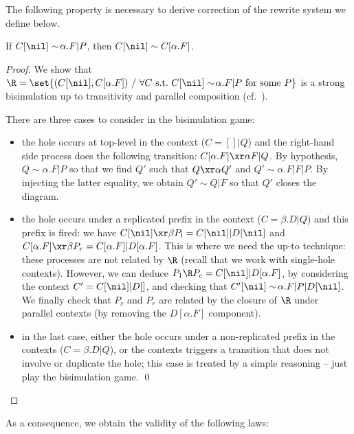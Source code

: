 \documentclass{llncs}
\begin{document}
The following property is necessary to derive correction of the
rewrite system we define below.
\begin{prop}\label{prop:simplelaw}
  If $C[\nil]\sim\!\alpha.F|P$, then $C[\nil]\sim C[\alpha.F]$.
\end{prop}
\begin{proof}
  We show that $\R = \set{(C[\nil], C[\alpha.F])~/~\forall C\text{
      s.t.\ } C[\nil]\sim\!\alpha.F|P\textrm{ for some }P}$ is a
  strong bisimulation up to transitivity and parallel composition
  (cf.~\cite{SW01,phd:pous}).

  There are three cases to consider in the bisimulation game:
  \begin{itemize}
  \item the hole occurs at top-level in the context ($C=[]|Q$) and the
    right-hand side process does the following transition:
    $C[\alpha.F]\xr\alpha F|Q$. By hypothesis, $Q\sim\!\alpha.F|P$ so
    that we find $Q'$ such that $Q\xr\alpha Q'$ and $Q'\sim
    \!\alpha.F|F|P$. By injecting the latter equality, we obtain
    $Q'\sim Q|F$ so that $Q'$ closes the diagram.
  \item the hole occurs under a replicated prefix in the context
    ($C=\!\beta.D|Q$) and this prefix is fired: we have
    $C[\nil]\xr\beta P_l=C[\nil]|D[\nil]$ and $C[\alpha.F]\xr\beta
    P_r=C[\alpha.F]|D[\alpha.F]$. This is where we need the up-to
    technique: these processes are not related by $\R$ (recall that we
    work with single-hole contexts). However, we can deduce $P_1\R
    P_c=C[\nil]|D[\alpha.F]$, by considering the context
    $C'=C[\nil]|D[]$, and checking that
    $C'[\nil]\sim\!\alpha.F|P|D[\nil]$. We finally check that $P_c$
    and $P_r$ are related by the closure of $\R$ under parallel
    contexts (by removing the $D[\alpha.F]$ component).
  \item in the last case, either the hole occurs under a
    non-replicated prefix in the contexts ($C=\beta.D|Q$), or the
    contexts triggers a transition that does not involve or duplicate
    the hole; this case is treated by a simple reasoning -- just play
    the bisimulation game.  \qed
  \end{itemize}
\end{proof}

As a consequence, we obtain the validity of the following laws:
\end{document}
